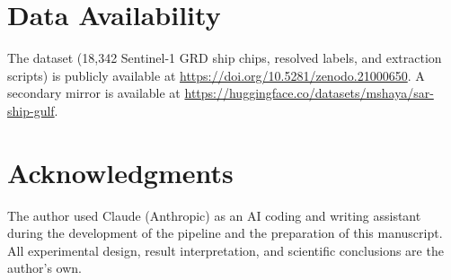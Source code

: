 \documentclass[journal]{IEEEtran}
\begin{document}
\section*{Data Availability}
The dataset (18,342 Sentinel-1 GRD ship chips, resolved labels, and
extraction scripts) is publicly available at
\url{https://doi.org/10.5281/zenodo.21000650}.
A secondary mirror is available at
\url{https://huggingface.co/datasets/mshaya/sar-ship-gulf}.

\section*{Acknowledgments}
The author used Claude (Anthropic) as an AI coding and writing assistant
during the development of the pipeline and the preparation of this manuscript.
All experimental design, result interpretation, and scientific conclusions
are the author's own.
\end{document}
